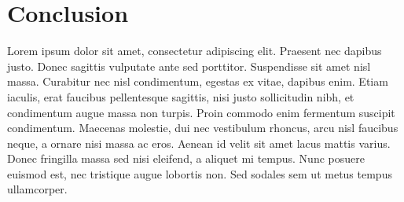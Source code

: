 \newpage

\section*{Conclusion}

Lorem ipsum dolor sit amet, consectetur adipiscing elit. Praesent nec dapibus justo. Donec sagittis vulputate ante sed porttitor. Suspendisse sit amet nisl massa. Curabitur nec nisl condimentum, egestas ex vitae, dapibus enim. Etiam iaculis, erat faucibus pellentesque sagittis, nisi justo sollicitudin nibh, et condimentum augue massa non turpis. Proin commodo enim fermentum suscipit condimentum. Maecenas molestie, dui nec vestibulum rhoncus, arcu nisl faucibus neque, a ornare nisi massa ac eros. Aenean id velit sit amet lacus mattis varius. Donec fringilla massa sed nisi eleifend, a aliquet mi tempus. Nunc posuere euismod est, nec tristique augue lobortis non. Sed sodales sem ut metus tempus ullamcorper.

\pagebreak
